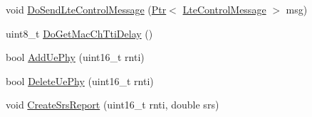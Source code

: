 \begin{DoxyCompactItemize}
void \hyperlink{classns3_1_1LteEnbPhy_abc9a5eee38a1e525a507577cacbaf808}{Do\+Send\+Lte\+Control\+Message} (\hyperlink{classns3_1_1Ptr}{Ptr}$<$ \hyperlink{classns3_1_1LteControlMessage}{Lte\+Control\+Message} $>$ msg)
\item 
uint8\+\_\+t \hyperlink{classns3_1_1LteEnbPhy_a92259583f54313a4569bb6e84b8c5b18}{Do\+Get\+Mac\+Ch\+Tti\+Delay} ()
\item 
bool \hyperlink{classns3_1_1LteEnbPhy_abcc07cb16d0b2f2a0ffb8cf5d14d7934}{Add\+Ue\+Phy} (uint16\+\_\+t rnti)
\item 
bool \hyperlink{classns3_1_1LteEnbPhy_a2ff7dd66c15b463936460ab729ab1c99}{Delete\+Ue\+Phy} (uint16\+\_\+t rnti)
\item 
void \hyperlink{classns3_1_1LteEnbPhy_a0cda53ae858a9e06d1e4c39c2bac5dcc}{Create\+Srs\+Report} (uint16\+\_\+t rnti, double srs)
\end{DoxyCompactItemize}
